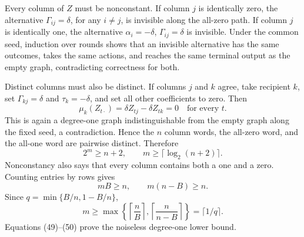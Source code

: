 Every column of \(Z\) must be nonconstant.  If column \(j\) is identically zero, the alternative \(\Gamma_{ij}=\delta\), for any \(i\ne j\), is invisible along the all-zero path.  If column \(j\) is identically one, the alternative \(\alpha_i=-\delta\), \(\Gamma_{ij}=\delta\) is invisible.  Under the common seed, induction over rounds shows that an invisible alternative has the same outcomes, takes the same actions, and reaches the same terminal output as the empty graph, contradicting correctness for both.

Distinct columns must also be distinct.  If columns \(j\) and \(k\) agree, take recipient \(k\), set \(\Gamma_{kj}=\delta\) and \(\tau_k=-\delta\), and set all other coefficients to zero.  Then
\[
 \mu_k(Z_{t\cdot})=\delta Z_{tj}-\delta Z_{tk}=0
 \quad\text{for every }t.
\]
This is again a degree-one graph indistinguishable from the empty graph along the fixed seed, a contradiction.  Hence the \(n\) column words, the all-zero word, and the all-one word are pairwise distinct.  Therefore
\[
 2^m\ge n+2,
 \qquad m\ge\lceil\log_2(n+2)\rceil.
 \tag{49}
\]
Nonconstancy also says that every column contains both a one and a zero.  Counting entries by rows gives
\[
 mB\ge n,
 \qquad m(n-B)\ge n.
\]
Since \(q=\min\{B/n,1-B/n\}\),
\[
 m\ge\max\!\left\{\left\lceil\frac nB\right\rceil,
                    \left\lceil\frac n{n-B}\right\rceil\right\}
 =\lceil1/q\rceil.
 \tag{50}
\]
Equations (49)--(50) prove the noiseless degree-one lower bound.